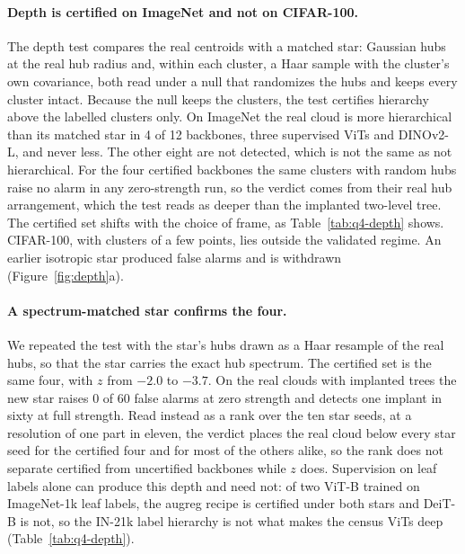 \documentclass{article}
\begin{document}
\paragraph{Depth is certified on ImageNet and not on CIFAR-100.} The depth test compares the real centroids with a matched star: Gaussian hubs at the real hub radius and, within each cluster, a Haar sample with the cluster's own covariance, both read under a null that randomizes the hubs and keeps every cluster intact. Because the null keeps the clusters, the test certifies hierarchy above the labelled clusters only. On ImageNet the real cloud is more hierarchical than its matched star in 4 of 12 backbones, three supervised ViTs and DINOv2-L, and never less. The other eight are not detected, which is not the same as not hierarchical. For the four certified backbones the same clusters with random hubs raise no alarm in any zero-strength run, so the verdict comes from their real hub arrangement, which the test reads as deeper than the implanted two-level tree. The certified set shifts with the choice of frame, as Table~\ref{tab:q4-depth} shows. CIFAR-100, with clusters of a few points, lies outside the validated regime. An earlier isotropic star produced false alarms and is withdrawn (Figure~\ref{fig:depth}a). %

\paragraph{A spectrum-matched star confirms the four.} We repeated the test with the star's hubs drawn as a Haar resample of the real hubs, so that the star carries the exact hub spectrum. The certified set is the same four, with $z$ from $-2.0$ to $-3.7$. On the real clouds with implanted trees the new star raises 0 of 60 false alarms at zero strength and detects one implant in sixty at full strength. Read instead as a rank over the ten star seeds, at a resolution of one part in eleven, the verdict places the real cloud below every star seed for the certified four and for most of the others alike, so the rank does not separate certified from uncertified backbones while $z$ does. Supervision on leaf labels alone can produce this depth and need not: of two ViT-B trained on ImageNet-1k leaf labels, the augreg recipe is certified under both stars and DeiT-B is not, so the IN-21k label hierarchy is not what makes the census ViTs deep (Table~\ref{tab:q4-depth}). %
\end{document}
